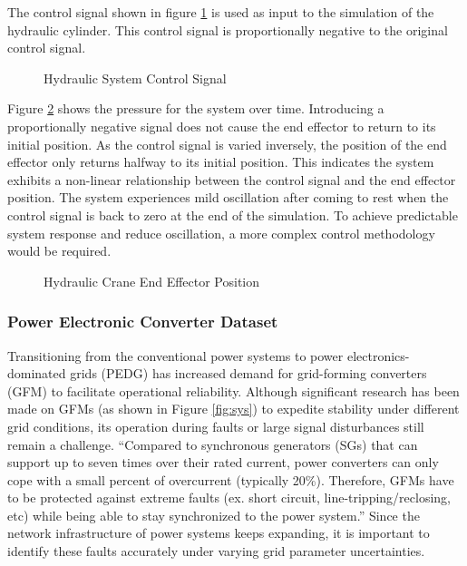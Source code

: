 The control signal shown in figure \ref{fig:hydraulic_cs} is used as input to the simulation of the hydraulic cylinder. This control signal is proportionally negative to the original control signal.

\begin{figure}[H]
    
    \caption{Hydraulic System Control Signal}
    \label{fig:hydraulic_cs}
\end{figure}

Figure \ref{fig:hydraulic_pos} shows the pressure for the system over time. Introducing a proportionally negative signal does not cause the end effector to return to its initial position. As the control signal is varied inversely, the position of the end effector only returns halfway to its initial position. This indicates the system exhibits a non-linear relationship between the control signal and the end effector position.    The system experiences mild oscillation after coming to rest when the control signal is back to zero at the end of the simulation. To achieve predictable system response and reduce oscillation, a more complex control methodology would be required.

\begin{figure}[H]
    
    \caption{Hydraulic Crane End Effector Position}
    \label{fig:hydraulic_pos}
\end{figure}

\subsubsection{Power Electronic Converter Dataset}
\label{ref_pec_dataset}

Transitioning from the conventional power systems to power electronics-dominated grids (PEDG) has increased demand for grid-forming converters (GFM) to facilitate operational reliability. Although significant research has been made on GFMs (as shown in Figure \ref{fig:sys}) to expedite stability under different grid conditions, its operation during faults or large signal disturbances still remain a challenge. \enquote{Compared to synchronous generators (SGs) that can support up to seven times over their rated current, power converters can only cope with a small percent of overcurrent (typically 20\%). Therefore, GFMs have to be protected against extreme faults (ex. short circuit, line-tripping/reclosing, etc) while being able to stay synchronized to the power system.}\parencite{trainsient-stability-9523750} Since the network infrastructure of power systems keeps expanding, it is important to identify these faults accurately under varying grid parameter uncertainties.

